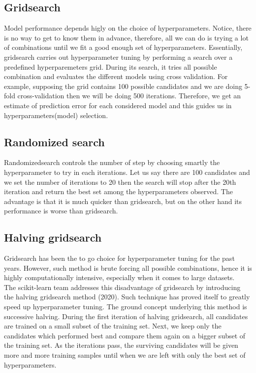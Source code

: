 \subsection{Gridsearch}
Model performance depends higly on the choice of hyperparameters. Notice, there is no way to get to know them in advance, therefore, all we can do is trying a lot of combinations until we fit a good enough set of hyperparameters. Essentially, gridsearch carries out hyperparameter tuning by performing a search over a predefined hyperparemeters grid. During its search, it tries all possible combination and evaluates the different models %
using cross validation. For example, supposing the grid contains 100 possible candidates and we are doing 5-fold cross-validation then we will be doing 500 iterations.
Therefore, we get an estimate of prediction error for each considered model and this guides us in hyperparameters(model) selection.

\subsection{Randomized search}
Randomizedsearch controls the number of step by choosing smartly the hyperparameter to try in each iterations.
Let us say there are 100 candidates and we set the number of iterations to 20 then the search will stop after the 20th iteration and return the best set among the hyperparameters observed.
The advantage is that it is much quicker than gridsearch, but on the other hand its performance is worse than gridsearch.

\subsection{Halving gridsearch}
Gridsearch has been the to go choice for hyperparameter tuning for the past years. However, such method is brute forcing all possible combinations, hence it is highly computationally intensive, especially when it comes to large datasets.
\\
The scikit-learn team addresses this disadvantage of gridsearch by introducing the halving gridsearch method \cite{scikithalvinggridsearch} (2020). Such technique has proved itself to greatly speed up hyperparameter tuning.
The ground concept underlying this method is successive halving. During the first iteration of halving gridsearch, all candidates are trained on a small subset of the training set. Next, we keep only the candidates which performed best and compare  them again on a bigger subset of the training set. As the iterations pass, the surviving candidates will be given more and more training samples until when we are left with only the best set of hyperparameters.

